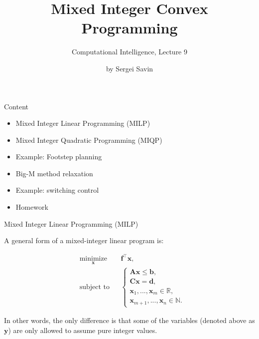 \documentclass{beamer}
\title{Mixed Integer Convex Programming}
\subtitle{Computational Intelligence, Lecture 9}
\author{by Sergei Savin}
\date{\mydate}
\begin{document}
\maketitle


\begin{frame}{Content}

\begin{itemize}
\item Mixed Integer Linear Programming (MILP)
\item Mixed Integer Quadratic Programming (MIQP)
\item Example: Footstep planning
\item Big-M method relaxation
\item Example: switching control
\item Homework
\end{itemize}

\end{frame}



\begin{frame}{Mixed Integer Linear Programming (MILP)}
\begin{flushleft}

A general form of a mixed-integer linear program is:

%
\begin{equation} \label{LP}
\begin{aligned}
& \underset{\mathbf{x}}{\text{minimize}}
& & \mathbf{f}^\top \mathbf{x}, \\
& \text{subject to}
& & \begin{cases} 
\mathbf{A} \mathbf{x}
\leq 
\mathbf{b}, \\ 
\mathbf{C}\mathbf{x} = 
\mathbf{d},  \\
\mathbf{x}_1, ..., \mathbf{x}_m \in \mathbb{R},\\
\mathbf{x}_{m+1}, ..., \mathbf{x}_n \in \mathbb{N}.
\end{cases}
%
\end{aligned}
\end{equation}
 
In other words, the only difference is that some of the variables (denoted above as $\mathbf{y}$) are only allowed to assume pure integer values.
 
\end{flushleft}
\end{frame}
\end{document}

